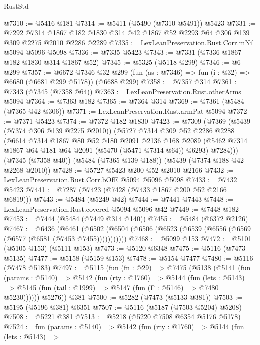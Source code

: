 \begin{lexlean}{RustStd}
\begin{coremodule}
@7310 := @5416 @181
@7314 := @5411 (@5490 (@7310 @5491)) @5423
@7331 := @7292
    @7314
    @1867
    @182
    @1830
    @314
    @42
    @1867
    @52
    @2293
    @64
    @306
    @139
    @309
    @2275
    @2010
    @2286
    @2289
@7335 := LexLeanPreservation.Rust.Corr.mNil @5094 @5096 @5098
@7336 := @7335 @5423
@7343 := @7331 (@7336 @1867 @182 @1830 @314 @1867 @52)
@7345 := @5325 (@5118 @299)
@7346 := @6 @299
@7357 := @6672
    @7346
    @32
    @299
    (fun (as : @7346) => fun (i : @32) => @6680 (@6681 @299 @5178))
    (@6688 @299)
@7358 := @7357 @314
@7361 := @7343 (@7345 (@7358 @64))
@7363 := LexLeanPreservation.Rust.otherArms @5094
@7364 := @7363 @182
@7365 := @7364 @314
@7369 := @7361 (@5484 (@7365 @42 @306))
@7371 := LexLeanPreservation.Rust.armPat @5094
@7372 := @7371 @5423
@7374 := @7372 @182 @1830
@7423 := @7309
    (@7369
      (@5439 (@7374 @306 @139 @2275 @2010))
      (@5727
        @7314
        @309
        @52
        @2286
        @2288
        (@6614
          @7314
          @1867
          @80
          @52
          @180
          @2091
          @2136
          @168
          @2089
          (@5462 @7314 @1867 @64 @181 @64 @2091 (@5470 (@5471 @7314 @64)) @6293)
          @7284)))
    (@7345 (@7358 @40))
    (@5484 (@7365 @139 @188))
    (@5439 (@7374 @188 @42 @2268 @2010))
@7428 := @5727 @5423 @200 @52 @2010 @2166
@7432 := LexLeanPreservation.Rust.Corr.bOfE @5094 @5096 @5098
@7433 := @7432 @5423
@7441 := @7287 (@7423 (@7428 (@7433 @1867 @200 @52 @2166 @6819)))
@7443 := @5484 (@5249 @42)
@7444 := @7441 @7443
@7448 := LexLeanPreservation.Rust.covered @5094 @5096 @42
@7449 := @7448 @182
@7453 := @7444 (@5484 (@7449 @314 @140))
@7455 := @5484 (@6372 @2126)
@7467 := @6436
    (@6461 (@6502 (@6504 (@6506 (@6523 (@6539 (@6556 (@6569 (@6577 (@6581 (@7453 @7455)))))))))))
@7468 := @5099 @153
@7472 := @5101 (@5105 @153) (@5111 @153)
@7473 := @5120 @6348
@7475 := @5116 (@7473 @5135)
@7477 := @5158 (@5159 @153)
@7478 := @5154 @7477
@7480 := @5116 (@7478 @5183)
@7497 := @5115
    (fun (fn : @29) =>
    @7475
      (@5138
        (@5141
          (fun (params : @5140) =>
          @5142
            (fun (rty : @1760) =>
            @5144
              (fun (lets : @5143) =>
              @5145 (fun (tail : @1999) => @5147 (fun (Γ : @5146) => @7480 @5230))))))
        @5276))
    @381
@7500 := @5282 (@7473 (@5133 @381))
@7503 := @5195 (@5196 @381) @6351
@7507 := @5116 (@5187 (@7503 @5204) @5208)
@7508 := @5221 @381
@7513 := @5218 (@5220 @7508 @6354 @5176 @5178)
@7524 := fun (params : @5140) =>
  @5142
    (fun (rty : @1760) =>
    @5144
      (fun (lets : @5143) =>

\end{coremodule}
\end{lexlean}
